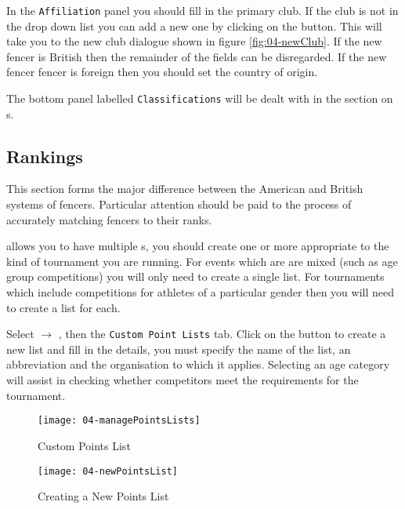 \documentclass[a4paper,11pt]{memoir}
\begin{document}
In the \texttt{Affiliation} panel you should fill in the primary club. If the club is not in the drop down list you can add a new one by clicking on the  button. This will take you to the new club dialogue shown in figure \ref{fig:04-newClub}. If the new fencer is British then the remainder of the fields can be disregarded. If the new fencer fencer is foreign then you should set the country of origin.

The bottom panel labelled \texttt{Classifications} will be dealt with in the section on s.

\subsection{Rankings}\label{sec:rankings}

This section forms the major difference between the American and British systems of  fencers. Particular attention should be paid to the process of accurately matching fencers to their ranks. 

\fencingtime{} allows you to have multiple s, you should create one or more appropriate to the kind of tournament you are running. For events which are are mixed (such as age group competitions) you will only need to create a single list. For tournaments which include competitions for athletes of a particular gender then you will need to create a list for each.

Select  $\rightarrow$ , then the \texttt{Custom Point Lists} tab. Click on the  button to create a new list and fill in the details, you must specify the name of the list, an abbreviation and the organisation to which it applies. Selecting an age category will assist in checking whether competitors meet the requirements for the tournament.

\begin{figure}[!ht]
 \centering
 \begin{minipage}{0.4\textwidth}
 \centering
 \texttt{[image: 04-managePointsLists]}
 \caption{Custom Points List} \label{fig:04-managePointsLists}  
 \end{minipage}
 \hfill
 \begin{minipage}{0.4\textwidth}
 \centering
 \texttt{[image: 04-newPointsList]}
 \caption{Creating a New Points List} \label{fig:04-newPointsList}    
 \end{minipage}
\end{figure}
\end{document}
